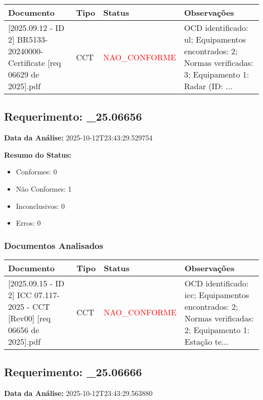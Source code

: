 \documentclass[12pt,a4paper]{article}
\begin{document}
\begin{longtable}{|p{4cm}|p{2cm}|p{2cm}|p{6cm}|}
\hline
\textbf{Documento} & \textbf{Tipo} & \textbf{Status} & \textbf{Observações} \\
\hline
\endhead
[Certificado de Conformidade Técnica - CCT][2025.09.12 - ID 2] BR5133-20240000-Certificate [req 06629 de 2025].pdf & CCT & \textcolor{red}{NAO\_CONFORME} & OCD identificado: ul; Equipamentos encontrados: 2; Normas verificadas: 3; Equipamento 1: Radar (ID: ... \\
\hline
\end{longtable}


\subsection{Requerimento: \_25.06656}

\textbf{Data da Análise:} 2025-10-12T23:43:29.529754

\textbf{Resumo do Status:}
\begin{itemize}
    \item Conformes: 0
    \item Não Conformes: 1
    \item Inconclusivos: 0
    \item Erros: 0
\end{itemize}

\subsubsection{Documentos Analisados}

\begin{longtable}{|p{4cm}|p{2cm}|p{2cm}|p{6cm}|}
\hline
\textbf{Documento} & \textbf{Tipo} & \textbf{Status} & \textbf{Observações} \\
\hline
\endhead
[Certificado de Conformidade Técnica - CCT][2025.09.15 - ID 2] ICC 07.117-2025 - CCT [Rev00] [req 06656 de 2025].pdf & CCT & \textcolor{red}{NAO\_CONFORME} & OCD identificado: icc; Equipamentos encontrados: 2; Normas verificadas: 2; Equipamento 1: Estação te... \\
\hline
\end{longtable}


\subsection{Requerimento: \_25.06666}

\textbf{Data da Análise:} 2025-10-12T23:43:29.563880
\end{document}
